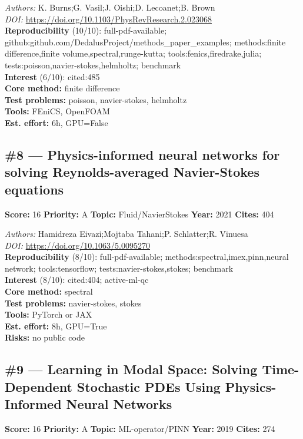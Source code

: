\documentclass[10pt,letterpaper]{article}
\begin{document}
\textit{Authors:} K. Burns;G. Vasil;J. Oishi;D. Lecoanet;B. Brown \\ 
\textit{DOI:} \url{https://doi.org/10.1103/PhysRevResearch.2.023068} \\ 
\textbf{Reproducibility } (10/10): full-pdf-available; github:github.com/DedalusProject/methods\_paper\_examples; methods:finite difference,finite volume,spectral,runge-kutta; tools:fenics,firedrake,julia; tests:poisson,navier-stokes,helmholtz; benchmark \\ 
\textbf{Interest } (6/10): cited:485 \\ 
\textbf{Core method:} finite difference \\ 
\textbf{Test problems:} poisson, navier-stokes, helmholtz \\ 
\textbf{Tools:} FEniCS, OpenFOAM \\ 
\textbf{Est. effort:} 6h, GPU=False \\ 

\subsection*{\#8 — Physics-informed neural networks for solving Reynolds-averaged Navier-Stokes equations}
\textbf{Score:} 16 \quad \textbf{Priority:} A \quad \textbf{Topic:} Fluid/NavierStokes \quad \textbf{Year:} 2021 \quad \textbf{Cites:} 404

\textit{Authors:} Hamidreza Eivazi;Mojtaba Tahani;P. Schlatter;R. Vinuesa \\ 
\textit{DOI:} \url{https://doi.org/10.1063/5.0095270} \\ 
\textbf{Reproducibility } (8/10): full-pdf-available; methods:spectral,imex,pinn,neural network; tools:tensorflow; tests:navier-stokes,stokes; benchmark \\ 
\textbf{Interest } (8/10): cited:404; active-ml-qc \\ 
\textbf{Core method:} spectral \\ 
\textbf{Test problems:} navier-stokes, stokes \\ 
\textbf{Tools:} PyTorch or JAX \\ 
\textbf{Est. effort:} 8h, GPU=True \\ 
\textbf{Risks:} no public code \\ 

\subsection*{\#9 — Learning in Modal Space: Solving Time-Dependent Stochastic PDEs Using Physics-Informed Neural Networks}
\textbf{Score:} 16 \quad \textbf{Priority:} A \quad \textbf{Topic:} ML-operator/PINN \quad \textbf{Year:} 2019 \quad \textbf{Cites:} 274
\end{document}
